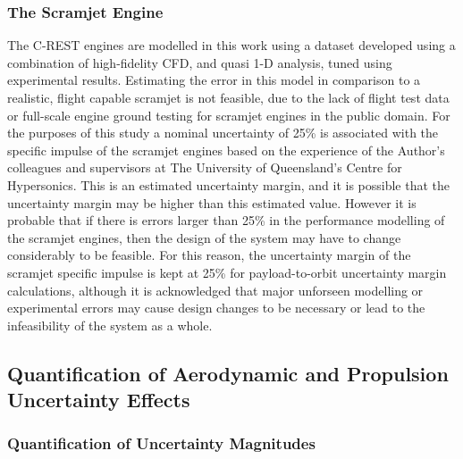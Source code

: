 \subsubsection{The Scramjet Engine}


The C-REST engines are modelled in this work using a dataset developed using a combination of high-fidelity CFD, and quasi 1-D analysis, tuned using experimental results. Estimating the error in this model in comparison to a realistic, flight capable scramjet is not feasible, due to the lack of flight test data or full-scale engine ground testing for scramjet engines in the public domain. For the purposes of this study a nominal uncertainty of 25\% is associated with the specific impulse of the scramjet engines based on the experience of the Author's colleagues and supervisors at The University of Queensland's Centre for Hypersonics. This is an estimated uncertainty margin, and it is possible that the uncertainty margin may be higher than this estimated value. However it is probable that if there is errors larger than 25\% in the performance modelling of the scramjet engines, then the design of the system may have to change considerably to be feasible. For this reason, the uncertainty margin of the scramjet specific impulse is kept at 25\% for payload-to-orbit uncertainty margin calculations, although it is acknowledged that major unforseen modelling or experimental errors may cause design changes to be necessary or lead to the infeasibility of the system as a whole. 


\subsection{Quantification of Aerodynamic and Propulsion Uncertainty Effects}


\subsubsection{Quantification of Uncertainty Magnitudes}

